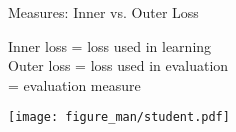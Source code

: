 \begin{vbframe}{Measures: Inner vs. Outer Loss}

\begin{center}
\lz
Inner loss = loss used in learning\\
\lz
Outer loss = loss used in evaluation\\
= evaluation measure
\lz

\texttt{[image: figure\_man/student.pdf]}\\

\end{center}

\end{vbframe}



% 
% 
% 

